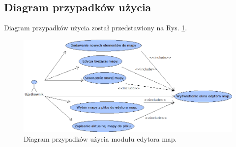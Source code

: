 \subsection{Diagram przypadków użycia}
\begin{par}
	Diagram przypadków użycia został przedstawiony na Rys. \ref{fig:diagram_przypadkow_mapa}.
		\begin{figure}[!h]
		\centering
		\includegraphics[width=\textwidth]{obrazki/use_case_editor.png}
		\caption{Diagram przypadków użycia modułu edytora map.}
		\label{fig:diagram_przypadkow_mapa}
		\end{figure}
		\FloatBarrier
\end{par}
